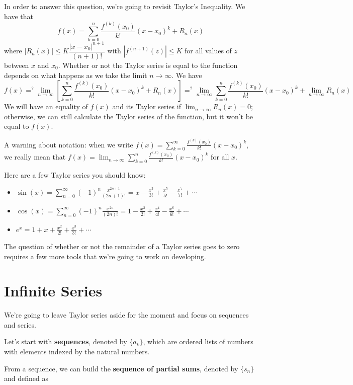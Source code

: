 \documentclass[
]{book}
\providecommand{\tightlist}{%
  \setlength{\itemsep}{0pt}\setlength{\parskip}{0pt}}
\theoremstyle{definition}
\theoremstyle{definition}
\theoremstyle{definition}
\theoremstyle{definition}
\theoremstyle{remark}
\begin{document}
In order to answer this question, we're going to revisit Taylor's Inequality. We have that \[f(x)=\sum_{k=0}^n\frac{f^{(k)}(x_0)}{k!}(x-x_0)^k+R_n(x)\] where \(|R_n(x)|\leq K \dfrac{|x-x_0|^{n+1}}{(n+1)!}\) with \(|f^{(n+1)}(z)|\leq K\) for all values of \(z\) between \(x\) and \(x_0\). Whether or not the Taylor series is equal to the function depends on what happens as we take the limit \(n\to\infty\). We have \[f(x)=^{?}\lim_{n\to\infty}\left [\sum_{k=0}^n\frac{f^{(k)}(x_0)}{k!}(x-x_0)^k+R_n(x) \right] =^? \lim_{n\to\infty}\sum_{k=0}^n\frac{f^{(k)}(x_0)}{k!}(x-x_0)^k + \lim_{n\to \infty}R_n(x)\]
We will have an equality of \(f(x)\) and its Taylor series if \(\displaystyle \lim_{n\to \infty}R_n(x)=0\); otherwise, we can still calculate the Taylor series of the function, but it won't be equal to \(f(x)\).

A warning about notation: when we write \(f(x)=\sum_{k=0}^\infty\frac{f^{(k)}(x_0)}{k!}(x-x_0)^k\), we really mean that \(f(x)=\lim_{n\to\infty}\sum_{k=0}^n\frac{f^{(k)}(x_0)}{k!}(x-x_0)^k\) for all \(x\).

Here are a few Taylor series you should know:

\begin{itemize}
\tightlist
\item
  \(\sin(x)=\sum_{n=0}^\infty (-1)^n \frac{x^{2n+1}}{(2n+1)!}=x-\frac{x^3}{3!}+\frac{x^5}{5!}-\frac{x^7}{7!}+\cdots\)
\item
  \(\cos(x)=\sum_{n=0}^\infty (-1)^n \frac{x^{2n}}{(2n)!}=1-\frac{x^2}{2!}+\frac{x^4}{4!}-\frac{x^6}{6!}+\cdots\)
\item
  \(e^x = 1+ x+ \frac{x^2}{2!}+\frac{x^3}{3!}+\cdots\)
\end{itemize}

The question of whether or not the remainder of a Taylor series goes to zero requires a few more tools that we're going to work on developing.

\hypertarget{infinite-series}{%
\section{Infinite Series}\label{infinite-series}}

We're going to leave Taylor series aside for the moment and focus on sequences and series.

Let's start with \textbf{sequences}, denoted by \(\{a_k\}\), which are ordered lists of numbers with elements indexed by the natural numbers.

From a sequence, we can build the \textbf{sequence of partial sums}, denoted by \(\{s_n\}\) and defined as
\end{document}
